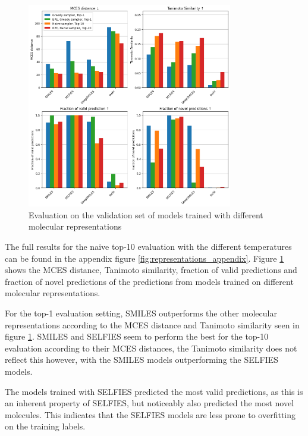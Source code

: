 \begin{figure}[h]
    \centering
    \includegraphics[width=0.8\textwidth]{figures/results/representations_with_tanimoto.png}
    \caption{Evaluation on the validation set of models trained with different molecular representations}
    \label{fig:representations}
\end{figure}

The full results for the naive top-10 evaluation with the different temperatures can be found in the appendix figure \ref{fig:representations_appendix}.
Figure \ref{fig:representations} shows the MCES distance, Tanimoto similarity, fraction of valid predictions and fraction of novel predictions of the predictions from models trained on different molecular representations.

For the top-1 evaluation setting, SMILES outperforms the other molecular representations according to the MCES distance and Tanimoto similarity seen in figure \ref{fig:representations}.
SMILES and SELFIES seem to perform the best for the top-10 evaluation according to their MCES distances, the Tanimoto similarity does not reflect this however, with the SMILES models outperforming the SELFIES models.

The models trained with SELFIES predicted the most valid predictions, as this is an inherent property of SELFIES, but noticeably also predicted the most novel molecules.
This indicates that the SELFIES models are less prone to overfitting on the training labels.

